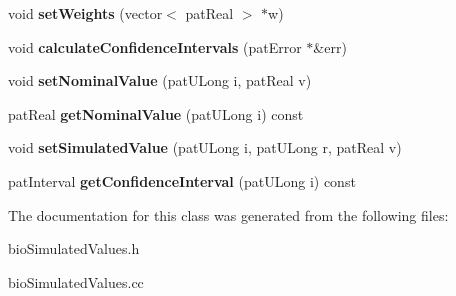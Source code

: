 \begin{DoxyCompactItemize}
void {\bfseries set\+Weights} (vector$<$ pat\+Real $>$ $\ast$w)
\item 
\mbox{\label{classbio_simulated_values_a8b6b3f1d76998bc017712a2c34da4c25}} 
void {\bfseries calculate\+Confidence\+Intervals} (pat\+Error $\ast$\&err)
\item 
\mbox{\label{classbio_simulated_values_a693f4065bff04f7a3e688de84ef450d4}} 
void {\bfseries set\+Nominal\+Value} (pat\+U\+Long i, pat\+Real v)
\item 
\mbox{\label{classbio_simulated_values_af0f9def39fbc0a65f41ee0a816c86945}} 
pat\+Real {\bfseries get\+Nominal\+Value} (pat\+U\+Long i) const
\item 
\mbox{\label{classbio_simulated_values_af1dbe65d0746a7d8c99d1f11d3d0e416}} 
void {\bfseries set\+Simulated\+Value} (pat\+U\+Long i, pat\+U\+Long r, pat\+Real v)
\item 
\mbox{\label{classbio_simulated_values_a3d64b23a347673b4b7b1ec31e25344af}} 
pat\+Interval {\bfseries get\+Confidence\+Interval} (pat\+U\+Long i) const
\end{DoxyCompactItemize}


The documentation for this class was generated from the following files\+:\begin{DoxyCompactItemize}
\item 
bio\+Simulated\+Values.\+h\item 
bio\+Simulated\+Values.\+cc\end{DoxyCompactItemize}
